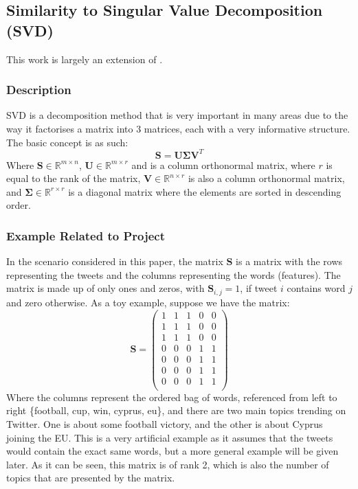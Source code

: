 \documentclass[11pt,a4paper]{article}
\begin{document}
\subsection{Similarity to Singular Value Decomposition (SVD)}
This work is largely an extension of \cite{lecture_svd}.

\subsubsection{Description}
SVD is a decomposition method that is very important in many areas due to the way it factorises a matrix into 3 matrices, each with a very informative structure. The basic concept is as such:
\begin{equation}
\mathbf{S} = \mathbf{U}\mathbf{\Sigma}\mathbf{V}^T
\end{equation}
Where $\mathbf{S} \in \mathbb{R}^{m \times n}$,  $\mathbf{U} \in \mathbb{R}^{m \times r}$ and is a column orthonormal matrix, where $r$ is equal to the rank of the matrix,  $\mathbf{V} \in \mathbb{R}^{n \times r}$ is also a column orthonormal matrix, and  $\mathbf{\Sigma} \in \mathbb{R}^{r \times r}$ is a diagonal matrix where the elements are sorted in descending order.

\subsubsection{Example Related to Project}
In the scenario considered in this paper, the matrix $\mathbf{S}$ is a matrix with the rows representing the tweets and the columns representing the words (features). The matrix is made up of only ones and zeros, with $\mathbf{S}_{i,j} = 1$, if tweet $i$ contains word $j$ and zero otherwise. As a toy example, suppose we have the matrix:
\begin{equation}
\mathbf{S} = 
\begin{pmatrix}
1 & 1 & 1 & 0 & 0\\
1 & 1 & 1 & 0 & 0\\
1 & 1 & 1 & 0 & 0\\
0 & 0 & 0 & 1 & 1\\
0 & 0 & 0 & 1 & 1\\
0 & 0 & 0 & 1 & 1\\
0 & 0 & 0 & 1 & 1\\
\end{pmatrix}
\end{equation}
Where the columns represent the ordered bag of words, referenced from left to right \{football, cup, win, cyprus, eu\}, and there are two main topics trending on Twitter. One is about some football victory, and the other is about Cyprus joining the EU. This is a very artificial example as it assumes that the tweets would contain the exact same words, but a more general example will be given later. As it can be seen, this matrix is of rank 2, which is also the number of topics that are presented by the matrix. 
\end{document}
